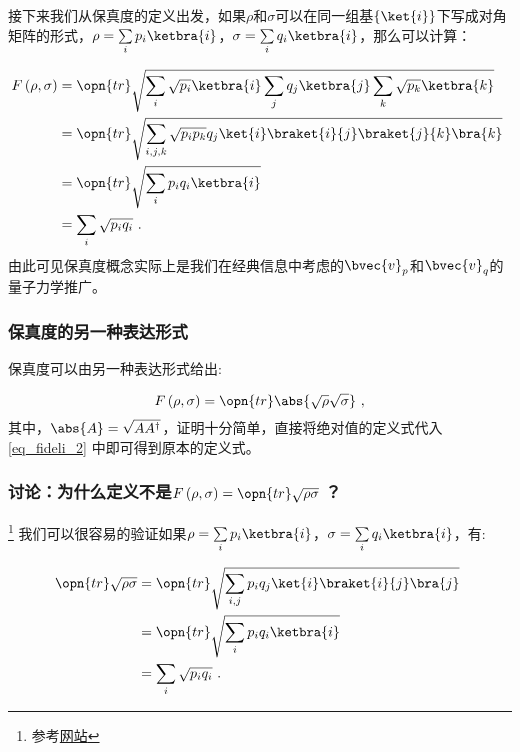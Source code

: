 接下来我们从保真度的定义出发，如果$\rho$和$\sigma$可以在同一组基$\left\{\ket{i}\right\}$下写成对角矩阵的形式，$\rho = \sum\limits_ip_i\ketbra{i}$，$\sigma = \sum\limits_iq_i\ketbra{i}$，那么可以计算：

\begin{equation}
\begin{aligned}
F\left(\rho,\sigma\right) &= \opn{tr}\sqrt{\sum_{i} \sqrt{p_i}\ketbra{i}\sum_{j}q_j\ketbra{j}\sum_k\sqrt{p_k}\ketbra{k}} \\
&= \opn{tr}\sqrt{\sum_{i,j,k}\sqrt{p_ip_k}q_j\ket{i}\braket{i}{j}\braket{j}{k}\bra{k}} \\
&= \opn{tr}\sqrt{\sum_ip_iq_i\ketbra{i}} \\
&= \sum_i\sqrt{p_iq_i}~.
\end{aligned}~
\end{equation}
由此可见保真度概念实际上是我们在经典信息中考虑的$\bvec{v}_p$和$\bvec{v}_q$的量子力学推广。

\subsubsection{保真度的另一种表达形式}

保真度可以由另一种表达形式给出:

\begin{equation}\label{eq_fideli_2}
F\left(\rho, \sigma\right) = \opn{tr}\abs{\sqrt{\rho}\sqrt{\sigma}}~,
\end{equation}
其中，$\abs{A} = \sqrt{AA^\dagger}$，证明十分简单，直接将绝对值的定义式代入\autoref{eq_fideli_2} 中即可得到原本的定义式。


\subsubsection{讨论：为什么定义不是$F\left(\rho,\sigma\right) = \opn{tr}\sqrt{\rho\sigma}~$？}
\footnote{参考\href{https://physics.stackexchange.com/questions/532223/why-is-the-standard-definition-of-fidelity-unnecessarily-complicated}{网站}}
我们可以很容易的验证如果$\rho = \sum\limits_i p_i\ketbra{i}$，$\sigma = \sum\limits_i q_i \ketbra{i}$，有:

\begin{equation}
\begin{aligned}
\opn{tr}\sqrt{\rho\sigma} &= \opn{tr}\sqrt{\sum_{i,j}p_iq_j\ket{i}\braket{i}{j}\bra{j}} \\
&= \opn{tr}\sqrt{\sum_ip_iq_i\ketbra{i}} \\&=\sum_i\sqrt{p_iq_i}~.
\end{aligned}~
\end{equation}

